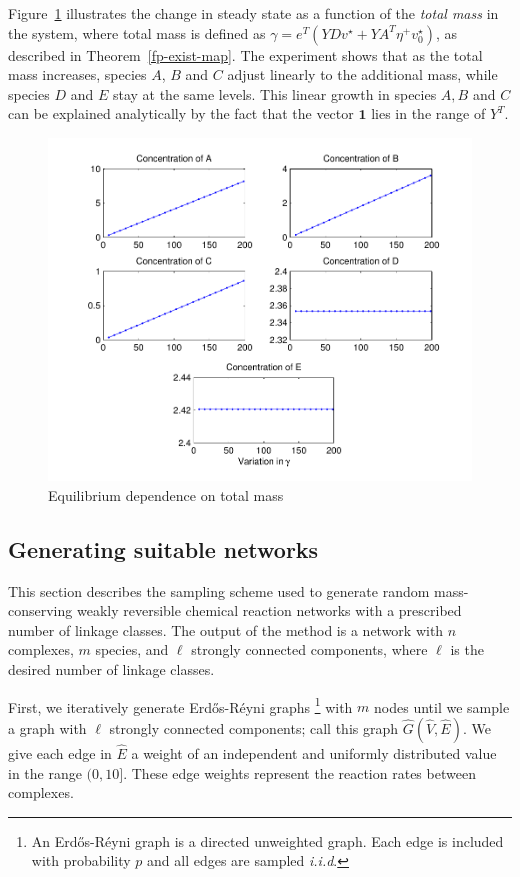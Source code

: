 \documentclass[smallextended]{svjour3}       %
\newcounter{sent}
\newcommand*{\0}{\mathbf{0}}
\newcommand*{\1}{\mathbf{1}}
\begin{document}
Figure~\ref{EquilibriumVsTotalMass} illustrates the change in steady state as a
function of the \emph{total mass} in the system, where total mass is defined as
$\gamma = e^T(YD v^\star + YA^T \eta^+ v^\star_0)$, as described in
Theorem~\ref{fp-exist-map}.  The experiment shows that as the total mass increases,
species $A$, $B$ and $C$ adjust linearly to the additional mass, while species
$D$ and $E$ stay at the same levels.  This linear growth in species $A, B$ and
$C$ can be explained analytically by the fact that the vector $\mathbf{1}$ lies
in the range of $Y^{T}$. 

\begin{figure}%
   \sidecaption
   \includegraphics[width=4.5in]{EquilibriumVsTotalMassExample}
   \caption{Equilibrium dependence on total mass} 
   \label{EquilibriumVsTotalMass}
\end{figure}

\subsection{Generating suitable networks}

This section describes the sampling scheme used to generate random mass-conserving
weakly reversible chemical reaction networks with a prescribed number of
linkage classes.  The output of the method is a network with $n$
complexes, $m$ species, and $\ell$ strongly connected components, where $\ell$
is the desired number of linkage classes.

First, we iteratively generate Erd\H{o}s-R\'{e}yni graphs%
\footnote{An Erd\H{o}s-R\'{e}yni graph is a directed unweighted graph. Each
edge is included with probability $p$ and all edges are sampled \emph{i.i.d}.} %
with $m$ nodes until we sample a graph with $\ell$ strongly connected
components; call this graph $\hat G( \hat V, \hat E)$.  We give each edge in 
$\hat E$ a weight of an independent and uniformly distributed value in the
range $(0,10]$.  These edge weights represent the reaction rates between
complexes.
\end{document}
